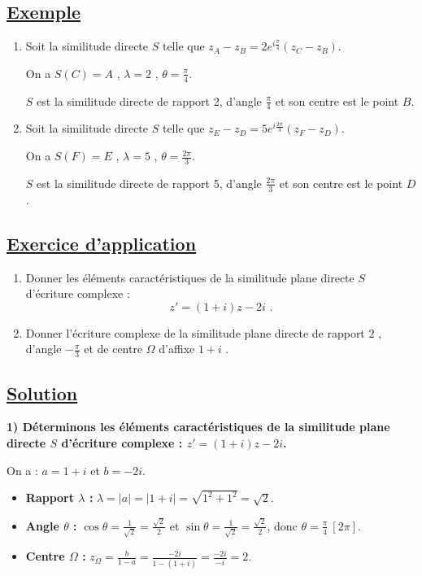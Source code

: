 \documentclass[12pt,a4paper]{article}
\begin{document}
\subsection*{ \underline{Exemple}}
\begin{enumerate}
    \item Soit la similitude directe $S$ telle que $z_A - z_B = 2 e^{i\frac{\pi}{4}}(z_C - z_B)$.
    
    On a $S(C) = A$ , $\lambda = 2$ , $\theta = \frac{\pi}{4}$.
    
    $S$ est la similitude directe de rapport 2, d'angle $\frac{\pi}{4}$ et son centre est le point $B$.
    
    \item Soit la similitude directe $S$ telle que $z_E - z_D = 5 e^{i\frac{2\pi}{3}}(z_F - z_D)$.
    
    On a $S(F) = E$ , $\lambda = 5$ , $\theta = \frac{2\pi}{3}$.
    
    $S$ est la similitude directe de rapport 5, d'angle $\frac{2\pi}{3}$ et son centre est le point $D$.
\end{enumerate}

\subsection*{ \underline{Exercice d'application}}

\begin{enumerate}
    \item Donner les éléments caractéristiques de la similitude plane directe $S$ d'écriture complexe :
    \[ z' = (1 + i) z - 2i \text{ .} \]
    \item Donner l'écriture complexe de la similitude plane directe de rapport $2$ , d'angle $-\frac{\pi}{3}$ et de centre $\Omega$ d'affixe $1 + i$ .
\end{enumerate}
\subsection*{ \underline{Solution}}

\textbf{1) Déterminons les éléments caractéristiques de la similitude plane directe \(S\) d'écriture complexe : \(z' = (1 + i) z - 2i\).}

On a : \(a = 1 + i\) et \(b = -2i\).

\begin{itemize}
    \item \textbf{Rapport \(\lambda\) :} \(\lambda = |a| = |1 + i| = \sqrt{1^2 + 1^2} = \sqrt{2}\).
    \item \textbf{Angle \(\theta\) :} \(\cos \theta = \frac{1}{\sqrt{2}} = \frac{\sqrt{2}}{2}\) et \(\sin \theta = \frac{1}{\sqrt{2}} = \frac{\sqrt{2}}{2}\), donc \(\theta = \frac{\pi}{4} \ [2\pi]\).
    \item \textbf{Centre \(\Omega\) :} \(z_{\Omega} = \frac{b}{1 - a} = \frac{-2i}{1 - (1 + i)} = \frac{-2i}{-i} = 2\).
\end{itemize}
\end{document}
